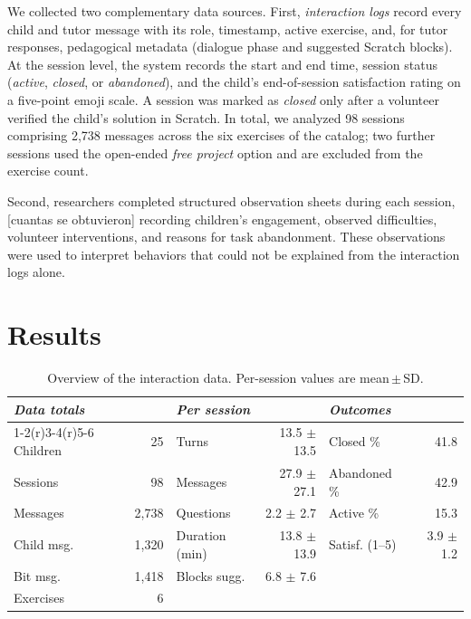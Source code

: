 \documentclass[fleqn,10pt]{JLA_article} %
\begin{document}
We collected two complementary data sources. First, \emph{interaction logs}
record every child and tutor message with its role, timestamp, active
exercise, and, for tutor responses, pedagogical metadata (dialogue phase and
suggested Scratch blocks). At the session level, the system records the
start and end time, session status (\emph{active}, \emph{closed}, or
\emph{abandoned}), and the child's end-of-session satisfaction rating on a
five-point emoji scale. A session was marked as \emph{closed} only after a
volunteer verified the child's solution in Scratch. In total, we analyzed
98 sessions comprising 2,738 messages across the six exercises of the
catalog; two further sessions used the open-ended \emph{free project} option
and are excluded from the exercise count.

Second, researchers completed structured observation sheets during each
session, [cuantas se obtuvieron] recording children's engagement, observed difficulties, volunteer
interventions, and reasons for task abandonment. These observations were
used to interpret behaviors that could not be explained from the interaction logs alone.
\section{Results}
\label{sec:results}
\begin{table}[ht]
\centering
\caption{Overview of the interaction data. Per-session values are mean\,$\pm$\,SD.}
\label{tab:corpus}
\footnotesize
\setlength{\tabcolsep}{4pt}
\begin{tabular}{lr@{\hskip 1.5em}lr@{\hskip 1.5em}lr}
\toprule
\multicolumn{2}{l}{\textit{Data totals}} &
\multicolumn{2}{l}{\textit{Per session}} &
\multicolumn{2}{l}{\textit{Outcomes}} \\
\cmidrule(r){1-2}\cmidrule(r){3-4}\cmidrule(r){5-6}
Children    & 25      & Turns          & 13.5 $\pm$ 13.5 & Closed \%      & 41.8 \\
Sessions    & 98      & Messages       & 27.9 $\pm$ 27.1 & Abandoned \%   & 42.9 \\
Messages    & 2{,}738 & Questions      & 2.2 $\pm$ 2.7   & Active \%      & 15.3 \\
Child msg.  & 1{,}320 & Duration (min) & 13.8 $\pm$ 13.9 & Satisf. (1--5) & 3.9 $\pm$ 1.2 \\
Bit msg.    & 1{,}418 & Blocks sugg.   & 6.8 $\pm$ 7.6   &                &    \\
Exercises   & 6       &                &                 &                &    \\
\bottomrule
\end{tabular}
\end{table}
\end{document}
